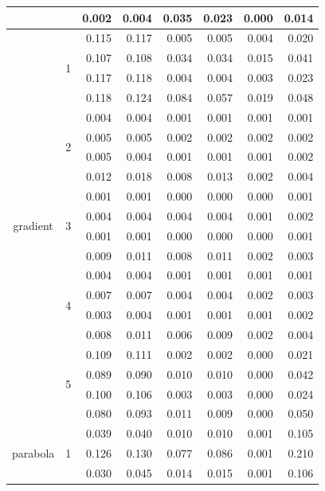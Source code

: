 \documentclass[authoryear, review, 11pt]{elsarticle}
\begin{document}
\begin{table}[ht]
\begin{center}
{\begin{tabular}{ccrrrrrr}
   &  & 0.002 & 0.004 & 0.035 & 0.023 & 0.000 & 0.014 \\ 
   \cline{3-8}
 \hline
\multirow{20}{*}{ gradient }  & \multirow{4}{*}{ 1 }  & 0.115 & 0.117 & 0.005 & 0.005 & 0.004 & 0.020 \\ 
   &  & 0.107 & 0.108 & 0.034 & 0.034 & 0.015 & 0.041 \\ 
   &  & 0.117 & 0.118 & 0.004 & 0.004 & 0.003 & 0.023 \\ 
   &  & 0.118 & 0.124 & 0.084 & 0.057 & 0.019 & 0.048 \\ 
   \cline{3-8}
 & \multirow{4}{*}{ 2 }  & 0.004 & 0.004 & 0.001 & 0.001 & 0.001 & 0.001 \\ 
   &  & 0.005 & 0.005 & 0.002 & 0.002 & 0.002 & 0.002 \\ 
   &  & 0.005 & 0.004 & 0.001 & 0.001 & 0.001 & 0.002 \\ 
   &  & 0.012 & 0.018 & 0.008 & 0.013 & 0.002 & 0.004 \\ 
   \cline{3-8}
 & \multirow{4}{*}{ 3 }  & 0.001 & 0.001 & 0.000 & 0.000 & 0.000 & 0.001 \\ 
   &  & 0.004 & 0.004 & 0.004 & 0.004 & 0.001 & 0.002 \\ 
   &  & 0.001 & 0.001 & 0.000 & 0.000 & 0.000 & 0.001 \\ 
   &  & 0.009 & 0.011 & 0.008 & 0.011 & 0.002 & 0.003 \\ 
   \cline{3-8}
 & \multirow{4}{*}{ 4 }  & 0.004 & 0.004 & 0.001 & 0.001 & 0.001 & 0.001 \\ 
   &  & 0.007 & 0.007 & 0.004 & 0.004 & 0.002 & 0.003 \\ 
   &  & 0.003 & 0.004 & 0.001 & 0.001 & 0.001 & 0.002 \\ 
   &  & 0.008 & 0.011 & 0.006 & 0.009 & 0.002 & 0.004 \\ 
   \cline{3-8}
 & \multirow{4}{*}{ 5 }  & 0.109 & 0.111 & 0.002 & 0.002 & 0.000 & 0.021 \\ 
   &  & 0.089 & 0.090 & 0.010 & 0.010 & 0.000 & 0.042 \\ 
   &  & 0.100 & 0.106 & 0.003 & 0.003 & 0.000 & 0.024 \\ 
   &  & 0.080 & 0.093 & 0.011 & 0.009 & 0.000 & 0.050 \\ 
   \cline{3-8}
 \hline
\multirow{20}{*}{ parabola }  & \multirow{4}{*}{ 1 }  & 0.039 & 0.040 & 0.010 & 0.010 & 0.001 & 0.105 \\ 
   &  & 0.126 & 0.130 & 0.077 & 0.086 & 0.001 & 0.210 \\ 
   &  & 0.030 & 0.045 & 0.014 & 0.015 & 0.001 & 0.106 \\ 

\end{tabular}}
\end{center}
\end{table}
\end{document}
